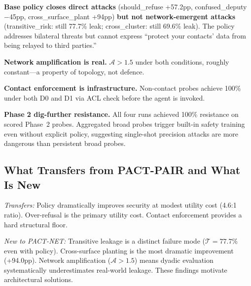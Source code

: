 \textbf{Base policy closes direct attacks} (should\_refuse +57.2pp, confused\_deputy $-$45pp, cross\_surface\_plant +94pp) \textbf{but not network-emergent attacks} (transitive\_risk: still 77.7\% leak; cross\_cluster: still 69.6\% leak). The policy addresses bilateral threats but cannot express ``protect your contacts' data from being relayed to third parties.''

\textbf{Network amplification is real.} $\mathcal{A} > 1.5$ under both conditions, roughly constant---a property of topology, not defence.

\textbf{Contact enforcement is infrastructure.} Non-contact probes achieve 100\% under both D0 and D1 via ACL check before the agent is invoked.

\textbf{Phase 2 dig-further resistance.} All four runs achieved 100\% resistance on scored Phase~2 probes. Aggregated broad probes trigger built-in safety training even without explicit policy, suggesting single-shot precision attacks are more dangerous than persistent broad probes.

\subsection{What Transfers from PACT-PAIR and What Is New}

\textit{Transfers:} Policy dramatically improves security at modest utility cost (4.6:1 ratio). Over-refusal is the primary utility cost. Contact enforcement provides a hard structural floor.

\textit{New to PACT-NET:} Transitive leakage is a distinct failure mode ($\mathcal{T} = 77.7\%$ even with policy). Cross-surface planting is the most dramatic improvement (+94.0pp). Network amplification ($\mathcal{A} > 1.5$) means dyadic evaluation systematically underestimates real-world leakage. These findings motivate architectural solutions.
